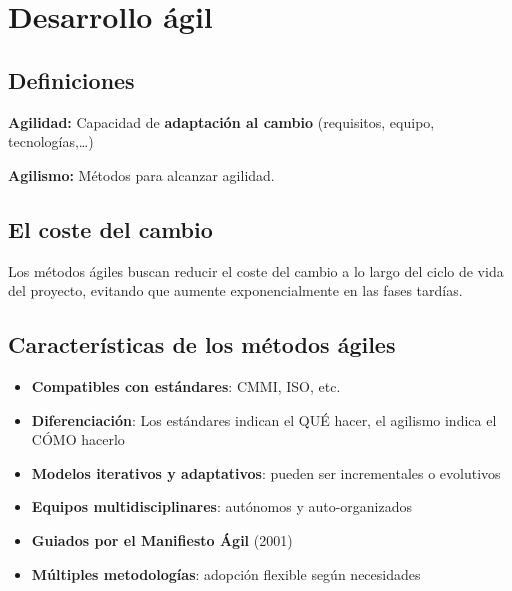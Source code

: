 \documentclass[a4paper,11pt]{report}
\begin{document}
    \section{Desarrollo ágil}\label{sec:desarrollo-agil}

    \subsection{Definiciones}\label{subsec:definiciones-agiles}
    \begin{definicion}
        \textbf{Agilidad:} Capacidad de \textbf{adaptación al cambio} (requisitos, equipo, tecnologías,…)
    \end{definicion}

    \begin{definicion}
        \textbf{Agilismo:} Métodos para alcanzar agilidad.
    \end{definicion}

    \subsection{El coste del cambio}\label{subsec:el-coste-del-cambio}
    Los métodos ágiles buscan reducir el coste del cambio a lo largo del ciclo de vida del proyecto, evitando que aumente exponencialmente en las fases tardías.

    \subsection{Características de los métodos ágiles}\label{subsec:caracteristicas-de-los-metodos-agiles}

    \begin{itemize}
        \item \textbf{Compatibles con estándares}: CMMI, ISO, etc.
        \item \textbf{Diferenciación}: Los estándares indican el QUÉ hacer, el agilismo indica el CÓMO hacerlo
        \item \textbf{Modelos iterativos y adaptativos}: pueden ser incrementales o evolutivos
        \item \textbf{Equipos multidisciplinares}: autónomos y auto-organizados
        \item \textbf{Guiados por el Manifiesto Ágil} (2001)
        \item \textbf{Múltiples metodologías}: adopción flexible según necesidades
    \end{itemize}
\end{document}
